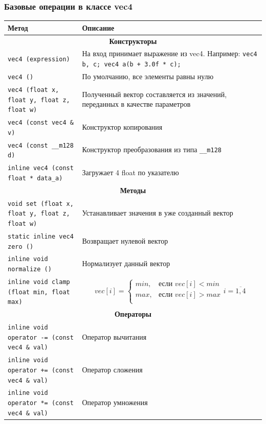 \documentclass[12pt, a4paper, utf8]{article}
\def\cf#1{\texttt{\small #1}}
\begin{document}
\subsubsection{Базовые операции в классе vec4}
\begin{center}
\begin{longtable}{|p{5cm}|p{10cm}|}
\hline
Метод & Описание \\ \hline
\multicolumn{2}{|c|}{\bf Конструкторы} \\ \hline
\cf{vec4 (expression)} & На вход принимает выражение из vec4. Например: \cf{vec4 b, c; vec4 a(b + 3.0f * c); } \\ \hline
\cf{vec4 ()} & По умолчанию, все элементы равны нулю \\ \hline
\cf{vec4 (float x, float y, float z, float w)} & Полученный вектор составляется из значений, переданных в качестве параметров \\ \hline
\cf{vec4 (const vec4 \& v)} & Конструктор копирования \\ \hline
\cf{vec4 (const \_\_m128 d)} & Конструктор преобразования из типа \cf{\_\_m128} \\ \hline
\cf{inline vec4 (const float * data\_a)} & Загружает 4 float по указателю \\ \hline
\multicolumn{2}{|c|}{\bf Методы} \\ \hline
\cf{void set (float x, float y, float z, float w)} & Устанавливает значения в уже созданный вектор \\ \hline
\cf{static inline vec4 zero ()} & Возвращает нулевой вектор \\ \hline
\cf{inline void normalize ()} & Нормализует данный вектор \\ \hline
\cf{inline void clamp (float min, float max)} & 
$$ 
vec[i] = \left\{ 
\begin{array}{cc}
min, & \mbox{если } vec[i] < min \\
max, & \mbox{если } vec[i] > max \\
\end{array}
\right. i = \overline{1,4}
$$ \\ \hline
\multicolumn{2}{|c|}{\bf Операторы} \\ \hline
\cf{inline void operator -= (const vec4 \& val)} & Оператор вычитания \\ \hline
\cf{inline void operator += (const vec4 \& val)} & Оператор сложения \\ \hline
\cf{inline void operator *= (const vec4 \& val)} & Оператор умножения \\ \hline

\end{longtable}
\end{center}
\end{document}
